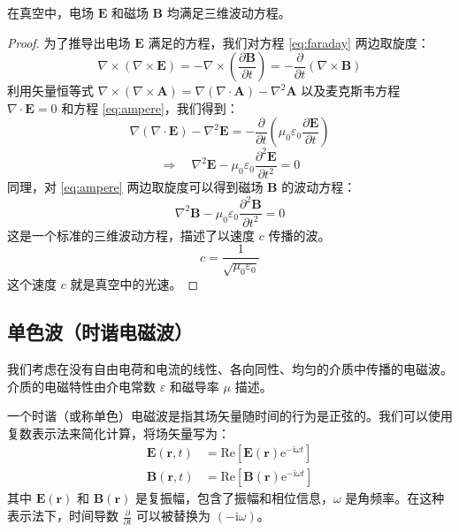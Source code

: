 \documentclass[fontset=none]{ctexart}
\begin{document}
\begin{theorem}[电磁波的波动方程]
在真空中，电场 $\bm{E}$ 和磁场 $\bm{B}$ 均满足三维波动方程。
\end{theorem}

\begin{proof}
为了推导出电场 $\bm{E}$ 满足的方程，我们对方程 \eqref{eq:faraday} 两边取旋度：
\begin{equation}
\nabla \times (\nabla \times \bm{E}) = -\nabla \times \left(\frac{\partial \bm{B}}{\partial t}\right) = -\frac{\partial}{\partial t}(\nabla \times \bm{B})
\end{equation}
利用矢量恒等式 $\nabla \times (\nabla \times \bm{A}) = \nabla(\nabla \cdot \bm{A}) - \nabla^2 \bm{A}$ 以及麦克斯韦方程 $\nabla \cdot \bm{E} = 0$ 和方程 \eqref{eq:ampere}，我们得到：
\begin{equation}
\nabla(\nabla \cdot \bm{E}) - \nabla^2 \bm{E} = -\frac{\partial}{\partial t}\left(\mu_0 \varepsilon_0 \frac{\partial \bm{E}}{\partial t}\right)
\end{equation}
\begin{equation}
\Rightarrow \quad \nabla^2 \bm{E} - \mu_0 \varepsilon_0 \frac{\partial^2 \bm{E}}{\partial t^2} = 0
\end{equation}
同理，对 \eqref{eq:ampere} 两边取旋度可以得到磁场 $\bm{B}$ 的波动方程：
\begin{equation}
\nabla^2 \bm{B} - \mu_0 \varepsilon_0 \frac{\partial^2 \bm{B}}{\partial t^2} = 0
\end{equation}
这是一个标准的三维波动方程，描述了以速度 $c$ 传播的波。
\begin{equation}
c = \frac{1}{\sqrt{\mu_0 \varepsilon_0}}
\end{equation}
这个速度 $c$ 就是真空中的光速。
\end{proof}

\subsection{单色波（时谐电磁波）}
我们考虑在没有自由电荷和电流的线性、各向同性、均匀的介质中传播的电磁波。介质的电磁特性由介电常数 $\varepsilon$ 和磁导率 $\mu$ 描述。

\begin{definition}[时谐场]
一个时谐（或称单色）电磁波是指其场矢量随时间的行为是正弦的。我们可以使用复数表示法来简化计算，将场矢量写为：
\begin{equation}
\begin{aligned}
\bm{E}(\bm{r}, t) &= \mathrm{Re}[\bm{E}(\bm{r}) \mathrm{e}^{-\mathrm{i}\omega t}] \\
\bm{B}(\bm{r}, t) &= \mathrm{Re}[\bm{B}(\bm{r}) \mathrm{e}^{-\mathrm{i}\omega t}]
\end{aligned}
\end{equation}
其中 $\bm{E}(\bm{r})$ 和 $\bm{B}(\bm{r})$ 是复振幅，包含了振幅和相位信息，$\omega$ 是角频率。在这种表示法下，时间导数 $\frac{\partial}{\partial t}$ 可以被替换为 $(-\mathrm{i}\omega)$。
\end{definition}
\end{document}
